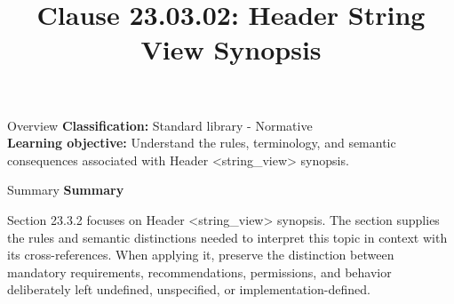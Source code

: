 \documentclass[10pt,letterpaper]{article}
\title{Clause 23.03.02: Header String View Synopsis}
\author{}
\date{}
\begin{document}
\maketitle
\begin{CornellOverviewBox}{Overview}
\textbf{Classification:} Standard library - Normative\\[2pt]
\textbf{Learning objective:} Understand the rules, terminology, and semantic consequences associated with Header <string\_view> synopsis.
\end{CornellOverviewBox}\begin{CornellSummaryBox}{Summary}
{\sffamily\bfseries\color{Accent} Summary}\par\vspace{3pt}Section 23.3.2 focuses on Header <string\_view> synopsis. The section supplies the rules and semantic distinctions needed to interpret this topic in context with its cross-references. When applying it, preserve the distinction between mandatory requirements, recommendations, permissions, and behavior deliberately left undefined, unspecified, or implementation-defined.
\end{CornellSummaryBox}
\end{document}
